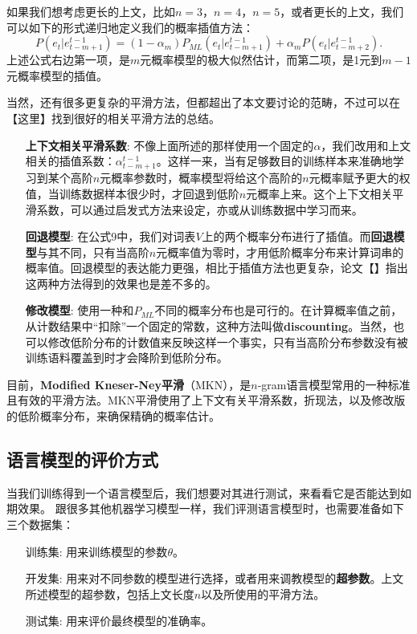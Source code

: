 \documentclass[10pt,a4paper]{ctexart}
\begin{document}
如果我们想考虑更长的上文，比如$n=3$，$n=4$，$n=5$，或者更长的上文，我们可以如下的形式递归地定义我们的概率插值方法：
\[
 P(e_t|e_{t-m+1}^{t-1}) = (1 - \alpha_{m})P_{ML}(e_t|e_{t-m+1}^{t-1}) + \alpha_{m}P(e_t|e_{t-m+2}^{t-1}).
\]
上述公式右边第一项，是$m$元概率模型的极大似然估计，而第二项，是1元到$m-1$元概率模型的插值。

当然，还有很多更复杂的平滑方法，但都超出了本文要讨论的范畴，不过可以在【这里】找到很好的相关平滑方法的总结。

\begin{enumerate}
\item[\textbf{上下文相关平滑系数}:] 不像上面所述的那样使用一个固定的$\alpha$，我们改用和上文相关的插值系数：$\alpha_{t-m+1}^{t-1}$。这样一来，当有足够数目的训练样本来准确地学习到某个高阶$n$元概率参数时，概率模型将给这个高阶的$n$元概率赋予更大的权值，当训练数据样本很少时，才回退到低阶$n$元概率上来。这个上下文相关平滑系数，可以通过启发式方法来设定，亦或从训练数据中学习而来。
\item[\textbf{回退模型}:] 在公式9中，我们对词表$V$上的两个概率分布进行了插值。而\textbf{回退模型}与其不同，只有当高阶$n$元概率值为零时，才用低阶概率分布来计算词串的概率值。回退模型的表达能力更强，相比于插值方法也更复杂，论文【】指出这两种方法得到的效果也是差不多的。
\item[\textbf{修改模型}:] 使用一种和$P_{ML}$不同的概率分布也是可行的。在计算概率值之前，从计数结果中“扣除”一个固定的常数，这种方法叫做\textbf{discounting}。当然，也可以修改低阶分布的计数值来反映这样一个事实，只有当高阶分布参数没有被训练语料覆盖到时才会降阶到低阶分布。
\end{enumerate}
目前，\textbf{Modified Kneser-Ney平滑}（MKN），是$n$-gram语言模型常用的一种标准且有效的平滑方法。MKN平滑使用了上下文有关平滑系数，折现法，以及修改版的低阶概率分布，来确保精确的概率估计。

\subsection{语言模型的评价方式}
当我们训练得到一个语言模型后，我们想要对其进行测试，来看看它是否能达到如期效果。
跟很多其他机器学习模型一样，我们评测语言模型时，也需要准备如下三个数据集：
\begin{enumerate}
\item[训练集:] 用来训练模型的参数$\theta$。
\item[开发集:] 用来对不同参数的模型进行选择，或者用来调教模型的\textbf{超参数}。上文所述模型的超参数，包括上文长度$n$以及所使用的平滑方法。
\item[测试集:] 用来评价最终模型的准确率。
\end{enumerate}
\end{document}
